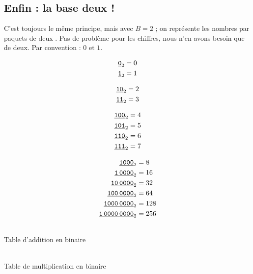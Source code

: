\subsection{Enfin : la base deux !}

C'est toujours le même principe, mais avec $B=2$ ; on représente les nombres \og par paquets de deux \fg{}. 
Pas de problème pour les chiffres, nous n'en avons besoin que de deux. Par convention : $0$ et $1$.

\begin{minipage}[t]{0.18\linewidth}
\begin{align*}
\underline{\text{\texttt{0}}}_{2} &= 0\\
\underline{\text{\texttt{1}}}_{2} &= 1\\
\end{align*}
\end{minipage}
\begin{minipage}[t]{0.18\linewidth}
\begin{align*}
\underline{\text{\texttt{10}}}_{2} &= 2\\
\underline{\text{\texttt{11}}}_{2} &= 3\\
\end{align*}
\end{minipage}
\begin{minipage}[t]{0.18\linewidth}
\begin{align*}  
\underline{\text{\texttt{100}}}_{2} &= 4\\
\underline{\text{\texttt{101}}}_{2} &= 5\\
\underline{\text{\texttt{110}}}_{2} &= 6\\
\underline{\text{\texttt{111}}}_{2} &= 7\\
\end{align*}
\end{minipage}
\begin{minipage}[t]{0.18\linewidth}
\begin{align*}
\underline{\text{\texttt{1000}}}_{2} &= 8\\
\underline{\text{\texttt{1\,0000}}}_{2} &= 16\\
\underline{\text{\texttt{10\,0000}}}_{2} &= 32\\
\underline{\text{\texttt{100\,0000}}}_{2} &= 64\\
\underline{\text{\texttt{1000\,0000}}}_{2} &= 128\\
\underline{\text{\texttt{1\,0000\,0000}}}_{2} &= 256\\
\end{align*}
\end{minipage}



  \begin{minipage}{0.5\textwidth}
  \begin{center}
    \\
  Table d'addition en binaire
  \end{center}
  \end{minipage}
  \begin{minipage}{0.5\textwidth}
  \begin{center}
    \\
  Table de multiplication en binaire
  \end{center}
  \end{minipage}

